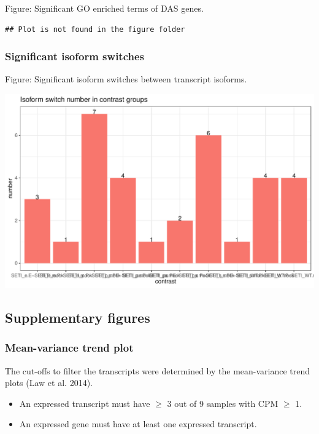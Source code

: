 \documentclass[]{article}
\providecommand{\tightlist}{%
  \setlength{\itemsep}{0pt}\setlength{\parskip}{0pt}}
\begin{document}
Figure: Significant GO enriched terms of DAS genes.

\begin{verbatim}
## Plot is not found in the figure folder
\end{verbatim}

\subsubsection{Significant isoform
switches}\label{significant-isoform-switches}

Figure: Significant isoform switches between transcript isoforms.

\includegraphics[width=16.67in]{X2025.01.13.16.34.12.j145/figure/Isoform switch number}

\subsection{Supplementary figures}\label{supplementary-figures}

\subsubsection{Mean-variance trend plot}\label{mean-variance-trend-plot}

The cut-offs to filter the transcripts were determined by the
mean-variance trend plots (Law et al. 2014).

\begin{itemize}
\tightlist
\item
  An expressed transcript must have \(\geq\) 3 out of 9 samples with CPM
  \(\geq\) 1.
\item
  An expressed gene must have at least one expressed transcript.
\end{itemize}
\end{document}

